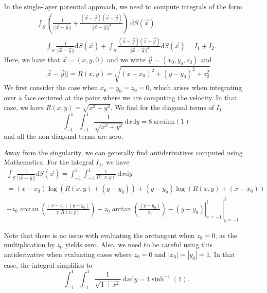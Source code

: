 In the single-layer potential approach, we need to compute integrals of the form
\begin{align}
 \int_S  \left( \frac{\bar{\bar{I}}}{  ||\vec{x}-\vec{y} ||  } + \frac{(\vec{x}-\vec{y}) (\vec{x}-\vec{y}) }{||\vec{x}-\vec{y}||^3} \right)  \ \text{d}S(\vec{x})
 \nonumber \\
 = \int_S   \frac{\bar{\bar{I}}}{  ||\vec{x}-\vec{y} ||  }\text{d}S(\vec{x}) + \int_S   \frac{(\vec{x}-\vec{y}) (\vec{x}-\vec{y}) }{||\vec{x}-\vec{y}||^3}   \text{d}S(\vec{x}) 
 = I_1 + I_2
 \label{eq_slp_int}.
\end{align}
Here, we have that $ \vec{x} = (x,y,0)$ and we write $\vec{y}= (x_0,y_0,z_0)$ and
\[
 ||\vec{x}-\vec{y}||=R(x,y) = \sqrt{ (x-x_0)^2+(y-y_0)^2+z_0^2  }
\]
 We first consider the case when $x_0=y_0=z_0=0$, which arises when integrating over a face centered at the point where we are computing the velocity. In that case, we have $R(x,y) = \sqrt{x^2+y^2}$. We find for the diagonal terms of $I_1$
\begin{equation}
\int_{-1}^{1} \int_{-1}^{1} \frac{1}{   \sqrt{ x^2+y^2  }  }  \ \text{d}x \text{d}y = 8 \ \text{arcsinh}(1)
\end{equation}
and all the non-diagonal terms are zero. 

Away from the singularity, we can generally find antiderivatives computed using Mathematica. For the integral $I_1$, we have
\begin{align}
\int_S \frac{1}{||\vec{x}-\vec{y}||}  \text{d}S(\vec{x})
 =
\int_{-1}^1 \int_{-1}^1  \frac{1   }{R(x,y)  } \ \text{d}x \text{d}y
\nonumber \\
=
(x-x_0) \log \left(R(x,y) + (y-y_0)\right)
+(y-y_0)\log \left(R(x,y) +(x-x_0)   \right) \nonumber \\
\left. \left. -z_0 \arctan \left(\frac{(x-x_0) (y-y_0)}{z_0 R(x,y) }\right)
+z_0 \arctan \left(\frac{(y-y_0)}{z_0}\right)
-(y-y_0)\right|_{x=-1}^1 \right|_{y=-1}^1 .
\label{eq_slp_const}
\end{align}

Note that there is no issue with evaluating the arctangent when $z_0=0$, as the multiplication by $z_0$ yields zero. Also, we need to be careful using this antiderivative when evaluating cases where $z_0=0$ and  $|x_0| = |y_0|=1$. In that case, the integral simplifies to 
\begin{equation}
\int_{-1}^{1} \int_{-1}^{1} \frac{1}{   \sqrt{ 1+x^2  }  }  \ \text{d}x \text{d}y = 4 \sinh^{-1}(1).
\end{equation}

